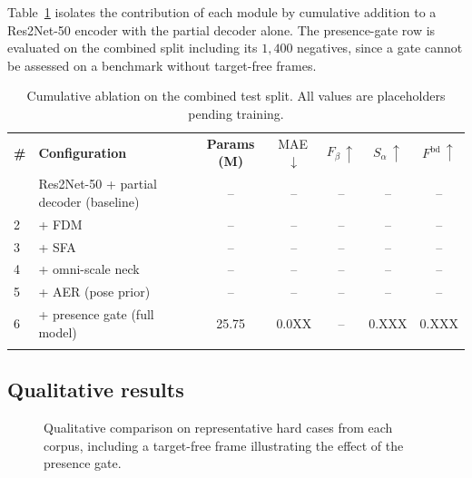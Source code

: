 \documentclass[3p,times,procedia]{elsarticle}
\newcommand{\TBD}{--}
\newcommand{\oMAEcomb}{0.0XX}  \newcommand{\oSacomb}{0.XXX}  \newcommand{\oFbdcomb}{0.XXX}
\newcommand{\Fbd}{F^{\mathrm{bd}}}
\begin{document}
Table~\ref{tab:ablation} isolates the contribution of each module by cumulative addition to a Res2Net-50 encoder with the partial decoder alone. The presence-gate row is evaluated on the combined split including its $1{,}400$ negatives, since a gate cannot be assessed on a benchmark without target-free frames.

\begin{table}[h]
\caption{Cumulative ablation on the combined test split. All values are placeholders pending training.}
\label{tab:ablation}
\footnotesize
\begin{tabular*}{\hsize}{@{\extracolsep{\fill}}llccccc@{}}
\toprule
\textbf{\#} & \textbf{Configuration} & \textbf{Params (M)} & MAE\,$\downarrow$ & $F_\beta\,\uparrow$ & $S_\alpha\,\uparrow$ & $\Fbd\,\uparrow$ \\
\colrule
1 & Res2Net-50 + partial decoder (baseline) & \TBD & \TBD & \TBD & \TBD & \TBD \\
2 & \quad + FDM                              & \TBD & \TBD & \TBD & \TBD & \TBD \\
3 & \quad + SFA                              & \TBD & \TBD & \TBD & \TBD & \TBD \\
4 & \quad + omni-scale neck                  & \TBD & \TBD & \TBD & \TBD & \TBD \\
5 & \quad + AER (pose prior)                 & \TBD & \TBD & \TBD & \TBD & \TBD \\
6 & \quad + presence gate (full model)       & 25.75 & \oMAEcomb & \TBD & \oSacomb & \oFbdcomb \\
\botrule
\end{tabular*}
\end{table}

\subsection{Qualitative results}

\begin{figure}[h]
\centering
\caption{Qualitative comparison on representative hard cases from each corpus, including a target-free frame illustrating the effect of the presence gate.}
\label{fig:qualitative}
\end{figure}
\end{document}
